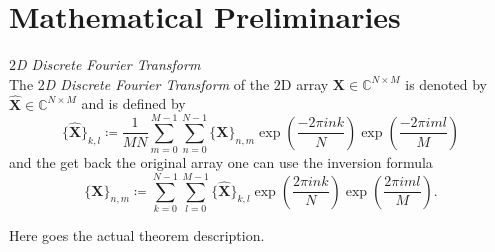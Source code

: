 \chapter{Mathematical Preliminaries}



\begin{Def}\label{def:dft}
    \emph{$2$D Discrete Fourier Transform}\\
    The \emph{$2$D Discrete Fourier Transform} of the $2$D array $\boldsymbol{X} \in \mathbb{C}^{N \times M}$ is denoted by 
    $\hat {\boldsymbol{X}} \in \mathbb{C}^{N \times M}$ and is defined by
    \begin{equation}\label{eq:dft}
        \{\hat {\boldsymbol{X}}\}_{k,l} \coloneq \frac{1}{MN}\sum_{m=0}^{M-1}\sum_{n=0}^{N-1} \{{\boldsymbol{X}}\}_{n,m}\exp\left({\frac{-2\pi ink}{N}}\right)\exp\left({\frac{-2\pi iml}{M}}\right)
    \end{equation}
    and the get back the original array one can use the inversion formula
    \begin{equation}\label{eq:idft}
        \{{\boldsymbol{X}}\}_{n,m} \coloneq \sum_{k=0}^{N-1}\sum_{l=0}^{M-1} \{\hat {\boldsymbol{X}}\}_{k,l}\exp\left({\frac{2\pi ink}{N}}\right)\exp\left({\frac{2\pi iml}{M}}\right).
    \end{equation}    
    
\end{Def}


\begin{Thm}\label{theorem:dft is unitary}
    
    Here goes the actual theorem description.
\end{Thm}